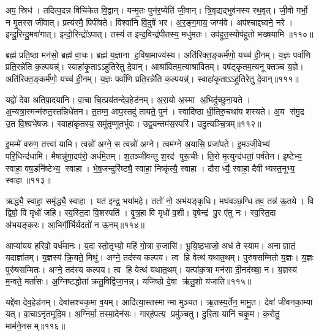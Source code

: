 अप॒ स्रिध॑। तदित्प॒दन्न विचि॑केत वि॒द्वान्। यन्मृ॒तः पुन॑र॒प्येति॑ जी॒वान्। त्रि॒वृद्यद्भुव॑नस्य रथ॒वृत्। जी॒वो गर्भो॒ न मृ॒तस्स जी॑वात्। प्रत्य॑स्मै॒ पिपी॑षते। विश्वा॑नि वि॒दुषे॑ भर। अ॒र॒ङ्ग॒माय॒ जग्म॑वे। अप॑श्चाद्दघ्वने॒ नरे। इन्दु॒रिन्दु॒मवा॑गात्। इन्दो॒रिन्द्रो॑ऽपात्। तस्य॑ त इन्द॒विन्द्र॑पीतस्य॒ मधु॑मतः। उप॑हूत॒स्योप॑हूतो भख्षयामि ॥११०॥\anuvakamend[उ॒द॒र्॒ष इ॑न्द्रि॒येण॒ गा म॒तिर॑र॒पा अ॑गा॒त्रीणि॑ च]

ब्रह्म॑ प्रति॒ष्ठा मन॑सो॒ ब्रह्म॑ वा॒चः। ब्रह्म॑ य॒ज्ञाना ह॒विषा॒माज्य॑स्य। अति॑रिक्त॒ङ्कर्म॑णो॒ यच्च॑ ही॒नम्। य॒ज्ञः पर्वा॑णि प्रति॒रन्ने॑ति क॒ल्पयन्न्॑। स्वाहा॑कृ॒ताऽऽहु॑तिरेतु दे॒वान्। आश्रा॑वितम॒त्याश्रा॑वितम्। वष॑ट्कृतम॒त्यनूक्तञ्च य॒ज्ञे। अति॑रिक्त॒ङ्कर्म॑णो॒ यच्च॑ ही॒नम्। य॒ज्ञः पर्वा॑णि प्रति॒रन्ने॑ति क॒ल्पयन्न्॑। स्वाहा॑कृ॒ताऽऽहु॑तिरेतु दे॒वान्॥१११॥

यद्वो॑ देवा अतिपा॒दया॑नि। वा॒चा चि॒त्प्रय॑तन्देव॒हेड॑नम्। अ॒रा॒यो अ॒स्मा अ॒भिदु॑च्छुना॒यते। अ॒न्यत्रा॒स्मन्म॑रुत॒स्तन्निधे॑तन। त॒तम्म॒ आप॒स्तदु॑ तायते॒ पुन॑। स्वादि॑ष्ठा धी॒तिरु॒चथा॑य शस्यते। अ॒य स॑मु॒द्र उ॒त वि॒श्वभे॑षजः। स्वाहा॑कृतस्य॒ समु॑तृप्णुतर्भुवः। उद्व॒यन्तम॑स॒स्परि॑। उदु॒त्यञ्चि॒त्रम्॥११२॥

इ॒मम्मे॑ वरुण॒ तत्त्वा॑ यामि। त्वन्नो॑ अग्ने॒ स त्वन्नो॑ अग्ने। त्वम॑ग्ने अ॒यासि॒ प्रजा॑पते। इ॒मञ्जी॒वेभ्य॑ परि॒धिन्द॑धामि। मैषान्नु॑गा॒दप॑रो॒ अर्ध॑मे॒तम्। श॒तञ्जी॑वन्तु श॒रद॑ पुरू॒चीः। ति॒रो मृ॒त्युन्द॑धतां॒ पर्व॑तेन। इ॒ष्टेभ्य॒ स्वाहा॒ वष॒डनि॑ष्टेभ्य॒ स्वाहा। भे॒ष॒जन्दुरि॑ष्ट्यै॒ स्वाहा॒ निष्कृ॑त्यै॒ स्वाहा। दौरार्ध्यै॒ स्वाहा॒ दैवीभ्यस्त॒नूभ्य॒ स्वाहा॥११३॥

ऋद्ध्यै॒ स्वाहा॒ समृ॑द्ध्यै॒ स्वाहा। यत॑ इन्द्र॒ भया॑महे। ततो॑ नो॒ अभ॑यङ्कृधि। मघ॑वञ्छ॒ग्धि तव॒ तन्न॑ ऊ॒तये। वि द्विषो॒ वि मृधो॑ जहि। स्व॒स्ति॒दा वि॒शस्पति॑। वृ॒त्र॒हा वि मृधो॑ व॒शी। वृषेन्द्र॑ पु॒र ए॑तु नः। स्व॒स्ति॒दा अ॑भयङ्क॒रः। आ॒भिर्गी॒र्भिर्यदतो॑ न ऊ॒नम्॥११४॥

आप्या॑यय हरिवो॒ वर्ध॑मानः। य॒दा स्तो॒तृभ्यो॒ महि॑ गो॒त्रा रु॒जासि॑। भू॒यि॒ष्ठ॒भाजो॒ अध॑ ते स्याम। अनाज्ञातं॒ यदाज्ञा॑तम्। य॒ज्ञस्य॑ क्रि॒यते॒ मिथु॑। अग्ने॒ तद॑स्य कल्पय। त्व हि वेत्थ॑ यथात॒थम्। पुरु॑षसम्मितो य॒ज्ञः। य॒ज्ञः पुरु॑षसम्मितः। अग्ने॒ तद॑स्य कल्पय। त्व हि वेत्थ॑ यथात॒थम्। यत्पा॑क॒त्रा मन॑सा दी॒नद॑ख्षा॒ न। य॒ज्ञस्य॑ म॒न्वते॒ मर्ता॑सः। अ॒ग्निष्टद्धोता॑ क्रतु॒विद्वि॑जा॒नन्न्। यजि॑ष्ठो दे॒वा ऋ॑तु॒शो य॑जाति॥११५॥\anuvakamend[दे॒वा श्चि॒त्रं त॒नूभ्य॒ स्वाहो॒नं पुरु॑षसम्मि॒तोऽग्ने॒ तद॑स्य कल्पय॒ पञ्च॑ च]

यद्दे॑वा देव॒हेड॑नम्। देवा॑सश्चकृ॒मा व॒यम्। आदि॑त्या॒स्तस्मान्मा मुञ्चत। ऋ॒तस्य॒र्तेन॒ मामु॒त। देवा॑ जीवनका॒म्या यत्। वा॒चाऽनृ॑तमूदि॒म। अ॒ग्निर्मा॒ तस्मा॒देन॑सः। गार्‌ह॑पत्य॒ प्रमु॑ञ्चतु। दु॒रि॒ता यानि॑ चकृ॒म। क॒रोतु॒ माम॑ने॒नसम्॥११६॥

